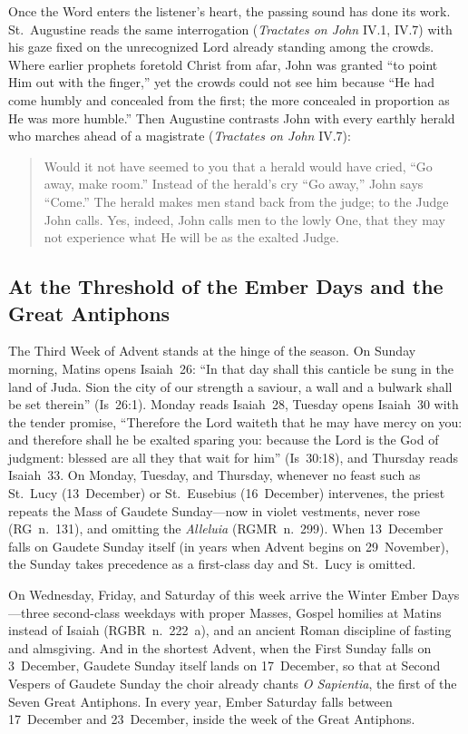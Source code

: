 Once the Word enters the listener's heart, the passing sound has done
its work. St.~Augustine reads the same interrogation
(\textit{Tractates on John} IV.1, IV.7) with his gaze fixed on the
unrecognized Lord already standing among the crowds. Where earlier prophets foretold Christ from
afar, John was granted ``to point Him out with the finger,'' yet the
crowds could not see him because ``He had come humbly and concealed from
the first; the more concealed in proportion as He was more humble.''
Then Augustine contrasts John with every earthly herald who marches
ahead of a magistrate (\textit{Tractates on John} IV.7):

\begin{quote}
Would it not have seemed to you that a herald would have cried, ``Go
away, make room.'' Instead of the herald's cry ``Go away,'' John says
``Come.'' The herald makes men stand back from the judge; to the Judge
John calls. Yes, indeed, John calls men to the lowly One, that they may
not experience what He will be as the exalted Judge.
\end{quote}

\subsection{At the Threshold of the Ember Days and the Great Antiphons}

The Third Week of Advent stands at the hinge of the season. On Sunday
morning, Matins opens Isaiah~26: ``In that day shall this canticle be
sung in the land of Juda. Sion the city of our strength a saviour, a
wall and a bulwark shall be set therein'' (Is~26:1). Monday reads
Isaiah~28, Tuesday opens Isaiah~30 with the tender promise, ``Therefore
the Lord waiteth that he may have mercy on you: and therefore shall he
be exalted sparing you: because the Lord is the God of judgment: blessed
are all they that wait for him'' (Is~30:18), and Thursday reads
Isaiah~33. On Monday, Tuesday, and Thursday, whenever no feast such as
St.~Lucy (13~December) or St.~Eusebius (16~December) intervenes, the
priest repeats the Mass of Gaudete Sunday---now in violet vestments,
never rose (RG~n.~131), and omitting the \textit{Alleluia} (RGMR~n.~299).
When 13~December falls on Gaudete Sunday itself (in years when Advent
begins on 29~November), the Sunday takes precedence as a first-class day
and St.~Lucy is omitted.

On Wednesday, Friday, and Saturday of this week arrive the Winter Ember
Days---three second-class weekdays with proper Masses, Gospel homilies
at Matins instead of Isaiah (RGBR~n.~222~a), and an ancient Roman
discipline of fasting and almsgiving. And in the shortest Advent, when
the First Sunday falls on 3~December, Gaudete Sunday itself lands on
17~December, so that at Second Vespers of Gaudete Sunday the choir
already chants \textit{O Sapientia}, the first of the Seven Great
Antiphons. In every year, Ember Saturday falls between 17~December and
23~December, inside the week of the Great Antiphons.

